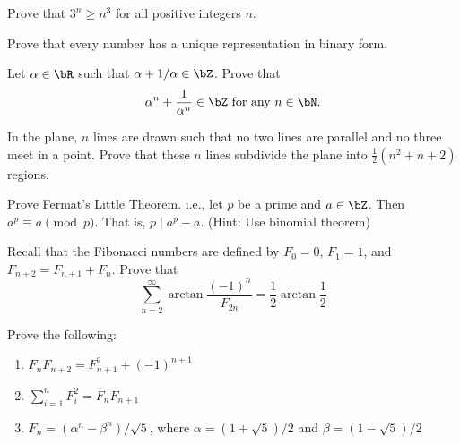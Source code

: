 \documentclass[12pt]{article}
\begin{document}
        \begin{exercise}
            Prove that \(3^n\geq n^3\) for all positive integers \(n\).
        \end{exercise}
        
        \begin{exercise}
            Prove that every number has a unique representation in binary form.
        \end{exercise}

        \begin{exercise}
            Let \(\alpha\in\bR\) such that \(\alpha + 1/\alpha\in\bZ\). Prove that
            \[\alpha^n+\frac{1}{\alpha^n}\in\bZ \text{ for any }n\in\bN.\]
        \end{exercise}
        
        \begin{exercise}
            In the plane, $n$ lines are drawn such that no two lines are parallel and no three meet in a point. Prove that these $n$ lines subdivide the plane into $\frac{1}{2}(n^2+n+2)$ regions.
        \end{exercise}
        
        \begin{exercise}
            Prove Fermat's Little Theorem. i.e., let \(p\) be a prime and \(a\in\bZ\). Then \(a^p\equiv a\pmod p\). That is, \(p\mid a^p-a\). (Hint: Use binomial theorem)
        \end{exercise}

        \begin{exercise}
            Recall that the Fibonacci numbers are defined by $F_0=0$, $F_1=1$, and $F_{n+2}=F_{n+1}+F_n$. Prove that
            \[\sum_{n=2}^\infty \arctan\frac{(-1)^n}{F_{2n}} = \frac{1}{2}\arctan{\frac{1}{2}}\]
        \end{exercise}

        \begin{exercise}
            Prove the following:
            \begin{enumerate}
                \item \(F_nF_{n+2}=F_{n+1}^2+(-1)^{n+1}\)
                \item \(\sum_{i=1}^nF_i^2=F_nF_{n+1}\)
                \item \(F_n=(\alpha^n-\beta^n)/\sqrt5\), where \(\alpha=(1+\sqrt5)/2\) and \(\beta=(1-\sqrt5)/2\)
            \end{enumerate}
        \end{exercise}
        
\end{document}
